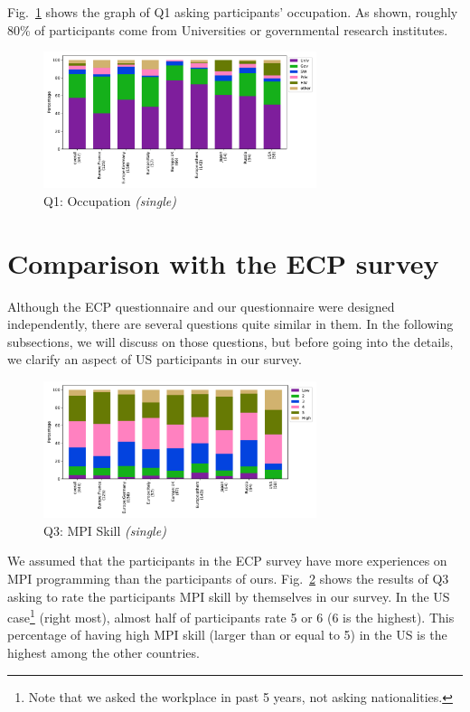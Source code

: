 \documentclass[conference,10pt,letterpaper]{IEEEtran}
\begin{document}
%
%
Fig.~\ref{fig:occupation} shows the graph of Q1 asking participants'
occupation. As shown, roughly 80\% of participants come from
Universities or governmental research institutes.
%
\begin{figure}[htb]
\begin{center}
\includegraphics[width=8cm]{Figs/Q1.pdf}
\caption{Q1: Occupation {\it(single)}}
\label{fig:occupation}
\end{center}
\end{figure}

\section{Comparison with the ECP survey}

Although the ECP questionnaire and our questionnaire were designed
independently, there are several questions quite similar in them. 
In the following subsections, we will discuss on those questions, but
before going into the details, we clarify an aspect of US 
participants in our survey.

\begin{figure}[htb]
\begin{center}
\includegraphics[width=8cm]{Figs/Q3.pdf}
\caption{Q3: MPI Skill {\it(single)}}
\label{fig:mpi-skill}
\end{center}
\end{figure}

We assumed that the participants in the ECP survey have more
experiences on MPI
programming than the participants of ours. Fig.~\ref{fig:mpi-skill} 
shows the results of Q3 asking to rate the participants MPI skill by
themselves in our survey.  In the US case\footnote{Note that we asked
  the workplace in past 5 years, not asking nationalities.} (right
most), almost half of participants rate 5 or 6
(6 is the highest). This percentage of having high MPI skill (larger
than or equal to 5) in the US is the highest among the other
countries. 
\end{document}
